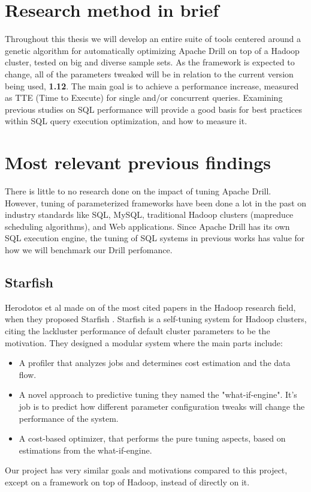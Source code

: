 \documentclass[a4paper,english]{report}
\begin{document}
		\section{Research method in brief}
		Throughout this thesis we will develop an entire suite of tools centered around a genetic algorithm for automatically optimizing Apache Drill on top of a Hadoop cluster, tested on big and diverse sample sets. As the framework is expected to change, all of the parameters tweaked will be in relation to the current version being used, \textbf{1.12}. The main goal is to achieve a performance increase, measured as TTE (Time to Execute) for single and/or concurrent queries. Examining previous studies on SQL performance will provide a good basis for best practices within SQL query execution optimization, and how to measure it.
		
		\section{Most relevant previous findings}
		There is little to no research done on the impact of tuning Apache Drill. However, tuning of parameterized frameworks have been done a lot in the past on industry standards like SQL, MySQL, traditional Hadoop clusters (mapreduce scheduling algorithms), and Web applications. Since Apache Drill has its own SQL execution engine,  the tuning of SQL systems in previous works has value for how we will benchmark our Drill perfomance.
			\subsection{Starfish}
			Herodotos et al made on of the most cited papers in the Hadoop research field, when they proposed Starfish \cite{starfish}. Starfish is a self-tuning system for Hadoop clusters, citing the lackluster performance of default cluster parameters to be the motivation. They designed a modular system where the main parts include:
			\begin{itemize}
				\item A profiler that analyzes jobs and determines cost estimation and the data flow.
				\item A novel approach to predictive tuning they named the "what-if-engine". It's job is to predict how different parameter configuration tweaks will change the performance of the system.
				\item A cost-based optimizer, that performs the pure tuning aspects, based on estimations from the what-if-engine.
			\end{itemize}
			Our project has very similar goals and motivations compared to this project, except on a framework on top of Hadoop, instead of directly on it.
		
\end{document}
